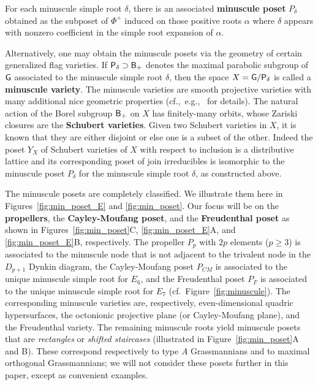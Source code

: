 \documentclass[12pt]{amsart}
\theoremstyle{definition}
\theoremstyle{remark}
\numberwithin{equation}{section}
\begin{document}
For each minuscule simple root $\delta$, there is an associated {\bf minuscule poset} $P_\delta$ obtained as the subposet of $\Phi^+$ induced on those positive roots $\alpha$ where $\delta$ appears with nonzero coefficient in the simple root expansion of $\alpha$. 

Alternatively, one may obtain the minuscule posets via the geometry of certain generalized flag varieties. If ${\sf P}_\delta \supset {\sf B_+}$ denotes the maximal parabolic subgroup of ${\sf G}$ associated to the minuscule simple root $\delta$, then the space $X = {\sf G} / {\sf P}_\delta$ is called a {\bf minuscule variety}. The minuscule varieties are smooth projective varieties with many additional nice geometric properties (cf.,~e.g.,~\cite{Billey.Lakshmibai} for details). The natural action of the Borel subgroup ${\sf B}_+$ on $X$ has finitely-many orbits, whose Zariski closures are the {\bf Schubert varieties}. Given two Schubert varieties in $X$, it is known that they are either disjoint or else one is a subset of the other. Indeed the poset $Y_X$ of Schubert varieties of $X$ with respect to inclusion is a distributive lattice and its corresponding poset of join irreducibles is isomorphic to the minuscule poset $P_\delta$ for the minuscule simple root $\delta$, as constructed above.

The minuscule posets are completely classified. We illustrate them here in Figures~\ref{fig:min_poset_E} and \ref{fig:min_poset}. Our focus will be on the {\bf propellers}, the {\bf Cayley-Moufang poset}, and the {\bf Freudenthal poset} as shown in Figures~\ref{fig:min_poset}C, \ref{fig:min_poset_E}A, and \ref{fig:min_poset_E}B, respectively. The propeller $P_p$ with $2p$ elements ($p \geq 3$) is associated to the minuscule node that is not adjacent to the trivalent node in the $D_{p+1}$ Dynkin diagram, the Cayley-Moufang poset $P_{CM}$ is associated to the unique minuscule simple root for $E_6$, and the Freudenthal poset $P_F$ is associated to the unique minuscule simple root for $E_7$ (cf.\ Figure~\ref{fig:minuscule}). The corresponding minuscule varieties are, respectively, even-dimensional quadric hypersurfaces, the octonionic projective plane (or Cayley-Moufang plane), and the Freudenthal variety. The remaining minuscule roots yield minuscule posets that are \emph{rectangles} or \emph{shifted staircases} (illustrated in Figure~\ref{fig:min_poset}A and B). These correspond respectively to type $A$ Grassmannians and to maximal orthogonal Grassmannians; we will not consider these posets further in this paper, except as convenient examples.
\end{document}
